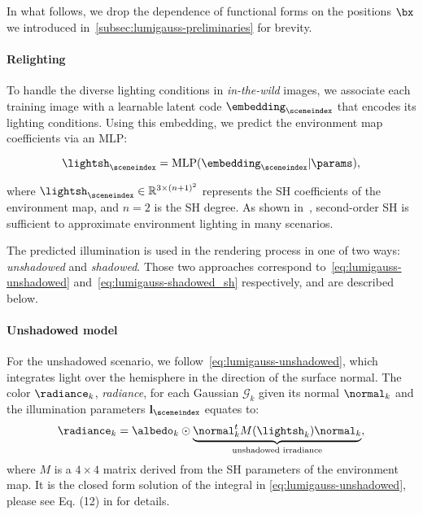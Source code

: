     In what follows, we drop the dependence of functional forms on the
    positions $\bx$ we introduced in~\cref{subsec:lumigauss-preliminaries} for
    brevity.

    \paragraph{Relighting}
      To handle the diverse lighting conditions in \textit{in-the-wild}
      images, we associate each training image with a learnable latent code
      $\embedding_\sceneindex$ that encodes its lighting conditions.
      Using this embedding, we predict the environment map coefficients via an MLP:

      \begin{equation} \label{eq:lumigauss-lightsh} \lightsh_\sceneindex = \text{MLP}(\embedding_\sceneindex | \params), \end{equation}

      where $\lightsh_\sceneindex \in \mathbb{R}^{3 \times (n+1)^2}$ represents the SH coefficients of the environment map, and $n{=}2$ is the SH degree.
      As shown in~\cite{ramamoorthi2001envmap}, second-order SH is sufficient
      to approximate environment lighting in many scenarios.

      The predicted illumination is used in the rendering process in one of
      two ways: \textit{unshadowed} and \textit{shadowed}.
      Those two approaches correspond to~\cref{eq:lumigauss-unshadowed}
      and~\cref{eq:lumigauss-shadowed_sh} respectively, and are described
      below.

    \paragraph{Unshadowed model}
      For the unshadowed scenario, we follow~\cref{eq:lumigauss-unshadowed},
      which integrates light over the hemisphere in the direction of the
      surface normal.
      The color $\radiance_k$, \textit{radiance}, for each Gaussian $\mathcal{G}_k$ given its normal $\normal_k$ and the illumination parameters $\mathbf{l}_\sceneindex$ equates to:
      \begin{equation}
        \label{eq:lumigauss-unshadowed-radiance}
        \radiance_k = \albedo_k \odot \underbrace{\normal_k^t M(\lightsh_k) \normal_k}_{\text{unshadowed irradiance}},
      \end{equation}
      where $M$ is a $4{\times}4$ matrix derived from the SH parameters of the environment map.
      It is the closed form solution of the integral in
      \cref{eq:lumigauss-unshadowed}, please see Eq.
      (12) in \cite{ramamoorthi2001envmap} for details.

